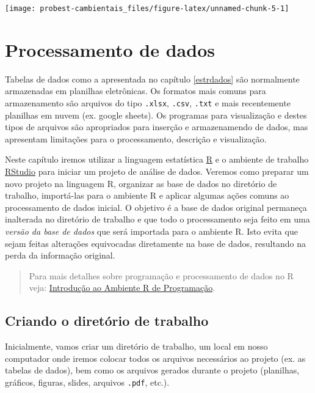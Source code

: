 \documentclass[
]{book}
\begin{document}
\begin{center}\texttt{[image: probest-cambientais\_files/figure-latex/unnamed-chunk-5-1]} \end{center}

\hypertarget{procdados}{%
\chapter{Processamento de dados}\label{procdados}}

Tabelas de dados como a apresentada no capítulo \ref{estrdados} são normalmente armazenadas em planilhas eletrônicas. Os formatos mais comuns para armazenamento são arquivos do tipo \texttt{.xlsx}, \texttt{.csv}, \texttt{.txt} e mais recentemente planilhas em nuvem (ex. google sheets). Os programas para visualização e destes tipos de arquivos são apropriados para inserção e armazenamendo de dados, mas apresentam limitações para o processamento, descrição e visualização.

Neste capítulo iremos utilizar a linguagem estatística \href{https://www.r-project.org/}{R} e o ambiente de trabalho \href{https://rstudio.com/}{RStudio} para iniciar um projeto de análise de dados. Veremos como preparar um novo projeto na linguagem R, organizar as base de dados no diretório de trabalho, importá-las para o ambiente R e aplicar algumas ações comuns ao processamento de dados inicial. O objetivo é a base de dados original permaneça inalterada no diretório de trabalho e que todo o processamento seja feito em uma \emph{versão da base de dados} que será importada para o ambiente R. Isto evita que sejam feitas alterações equivocadas diretamente na base de dados, resultando na perda da informação original.

\begin{quote}
Para mais detalhes sobre programação e processamento de dados no R veja: \href{https://fcopf.github.io/probest-introR/}{Introdução ao Ambiente R de Programação}.
\end{quote}

\hypertarget{criando-o-diretuxf3rio-de-trabalho}{%
\section{Criando o diretório de trabalho}\label{criando-o-diretuxf3rio-de-trabalho}}

Inicialmente, vamos criar um diretório de trabalho, um local em nosso computador onde iremos colocar todos os arquivos necessários ao projeto (ex. as tabelas de dados), bem como os arquivos gerados durante o projeto (planilhas, gráficos, figuras, slides, arquivos \texttt{.pdf}, etc.).
\end{document}
